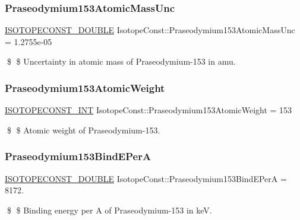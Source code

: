 \subsubsection{\texorpdfstring{Praseodymium153\+Atomic\+Mass\+Unc}{Praseodymium153AtomicMassUnc}}
{\footnotesize\ttfamily \mbox{\hyperlink{group___isotope_const-_macros_ga8f45a7272ce02c0b4c65c44636ed719a}{I\+S\+O\+T\+O\+P\+E\+C\+O\+N\+S\+T\+\_\+\+D\+O\+U\+B\+LE}} Isotope\+Const\+::\+Praseodymium153\+Atomic\+Mass\+Unc = 1.\+2755e-\/05}

\$ \$ Uncertainty in atomic mass of Praseodymium-\/153 in amu. \mbox{\label{group___isotope_const-_praseodymium-_pr153_ga2938812028d47baa4b341818cd74ad14}} 
\subsubsection{\texorpdfstring{Praseodymium153\+Atomic\+Weight}{Praseodymium153AtomicWeight}}
{\footnotesize\ttfamily \mbox{\hyperlink{group___isotope_const-_macros_ga5f18360b3e99483a35c32d789e62621c}{I\+S\+O\+T\+O\+P\+E\+C\+O\+N\+S\+T\+\_\+\+I\+NT}} Isotope\+Const\+::\+Praseodymium153\+Atomic\+Weight = 153}

\$ \$ Atomic weight of Praseodymium-\/153. \mbox{\label{group___isotope_const-_praseodymium-_pr153_ga1a632231c4ca102658b536cf25845fb9}} 
\subsubsection{\texorpdfstring{Praseodymium153\+Bind\+E\+PerA}{Praseodymium153BindEPerA}}
{\footnotesize\ttfamily \mbox{\hyperlink{group___isotope_const-_macros_ga8f45a7272ce02c0b4c65c44636ed719a}{I\+S\+O\+T\+O\+P\+E\+C\+O\+N\+S\+T\+\_\+\+D\+O\+U\+B\+LE}} Isotope\+Const\+::\+Praseodymium153\+Bind\+E\+PerA = 8172.}

\$ \$ Binding energy per A of Praseodymium-\/153 in keV. \mbox{\label{group___isotope_const-_praseodymium-_pr153_gaae16fe13749219f441ed118a1afbacf3}} 
